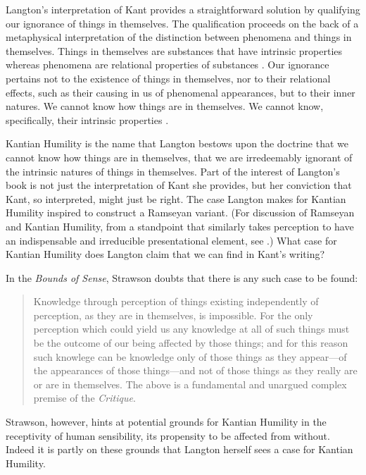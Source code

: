 Langton's interpretation of Kant provides a straightforward solution by qualifying our ignorance of things in themselves. The qualification proceeds on the back of a metaphysical interpretation of the distinction between phenomena and things in themselves. Things in themselves are substances that have intrinsic properties whereas phenomena are relational properties of substances \citep[20]{Langton:1998aa}. Our ignorance pertains not to the existence of things in themselves, nor to their relational effects, such as their causing in us of phenomenal appearances, but to their inner natures. We cannot know how things are in themselves. We cannot know, specifically, their intrinsic properties \citep[13]{Langton:1998aa}. 

Kantian Humility is the name that Langton bestows upon the doctrine that we cannot know how things are in themselves, that we are irredeemably ignorant of the intrinsic natures of things in themselves. Part of the interest of Langton's book is not just the interpretation of Kant she provides, but her conviction that Kant, so interpreted, might just be right. The case Langton makes for Kantian Humility inspired \citet{Lewis:2009ax} to construct a Ramseyan variant. (For discussion of Ramseyan and Kantian Humility, from a standpoint that similarly takes perception to have an indispensable and irreducible presentational element, see \citealt{Brewer:2011ks}.) What case for Kantian Humility does Langton claim that we can find in Kant's writing?

In the \emph{Bounds of Sense}, Strawson doubts that there is any such case to be found:
\begin{quote}
	Knowledge through perception of things existing independently of perception, as they are in themselves, is impossible. For the only perception which could yield us any knowledge at all of such things must be the outcome of our being affected by those things; and for this reason such knowlege can be knowledge only of those things as they appear---of the appearances of those things---and not of those things as they really are or are in themselves. The above is a fundamental and unargued complex premise of the \emph{Critique}. \citep[250]{Strawson:1966kx}
\end{quote}
Strawson, however, hints at potential grounds for Kantian Humility in the receptivity of human sensibility, its propensity to be affected from without. Indeed it is partly on these grounds that Langton herself sees a case for Kantian Humility.

